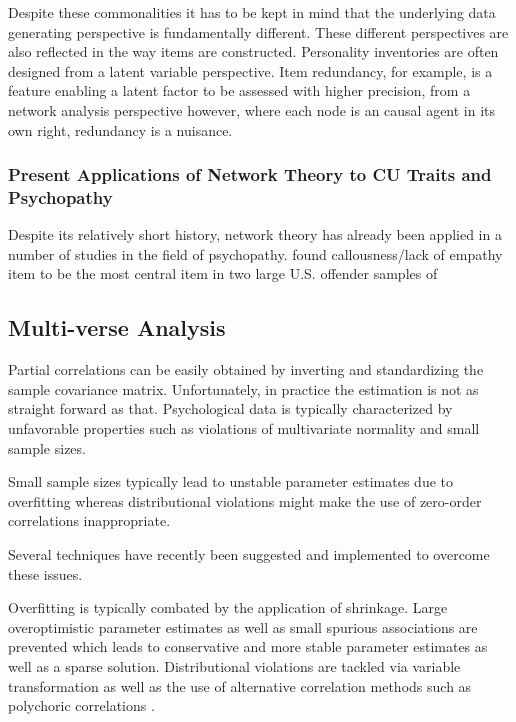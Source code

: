 Despite these commonalities it has to be kept in mind that the underlying data generating perspective is fundamentally different. 
These different perspectives are also reflected in the way items are constructed. 
Personality inventories are often designed from a latent variable perspective.
Item redundancy, for example, is a feature enabling a latent factor to be assessed with higher precision,
from a network analysis perspective however, where each node is an causal agent in its own right, redundancy is a nuisance. 


\subsubsection{Present Applications of Network Theory to CU Traits and Psychopathy}
Despite its relatively short history, network theory has already been applied in a number of studies in the field of psychopathy.
\textcites{verschuere_what_2018} found callousness/lack of empathy item to be the most central item in two large U.S. offender samples of 
\textcite{bronchain_network_2019}

\subsection{Multi-verse Analysis}

Partial correlations can be easily obtained by inverting and standardizing the sample covariance matrix. 
Unfortunately, in practice the estimation is not as straight forward as that.
Psychological data is typically characterized by unfavorable properties such as violations of multivariate normality and
small sample sizes.

Small sample sizes typically lead to unstable parameter estimates due to overfitting whereas distributional violations might make the use of zero-order correlations inappropriate.

Several techniques have recently been suggested and implemented to overcome these issues. 

Overfitting is typically combated by the application of shrinkage. 
Large overoptimistic parameter estimates as well as small spurious associations are prevented which leads to conservative and more stable parameter estimates as well as a sparse solution. 
Distributional violations are tackled via variable transformation as well as the use of alternative correlation methods such as polychoric correlations \parencite{epskamp_tutorial_2018}. 

